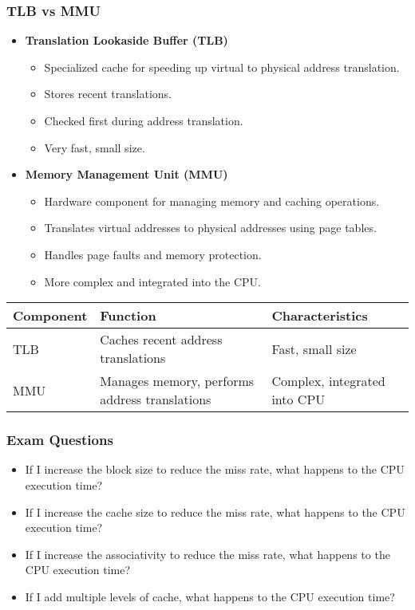 \begin{frame}
    \frametitle{TLB vs MMU}

    \begin{itemize}
        \item \textbf{Translation Lookaside Buffer (TLB)}
        \begin{itemize}
            \item Specialized cache for speeding up virtual to physical address translation.
            \item Stores recent translations.
            \item Checked first during address translation.
            \item Very fast, small size.
        \end{itemize}
        \item \textbf{Memory Management Unit (MMU)}
        \begin{itemize}
            \item Hardware component for managing memory and caching operations.
            \item Translates virtual addresses to physical addresses using page tables.
            \item Handles page faults and memory protection.
            \item More complex and integrated into the CPU.
        \end{itemize}
    \end{itemize}
    
    \begin{table}[h!]
        \centering
        \begin{tabular}{|p{2cm}|p{3cm}|p{3cm}|}
            \hline
            \textbf{Component} & \textbf{Function} & \textbf{Characteristics} \\
            \hline
    TLB & Caches recent address translations & Fast, small size \\
            \hline
    MMU & Manages memory, performs address translations & Complex, integrated into CPU \\
            \hline
        \end{tabular}
    \end{table}

\end{frame}

\begin{frame}
    \frametitle{Exam Questions}
    \begin{itemize}
        \item If I increase the block size to reduce the miss rate, what happens to the CPU execution time?
        \item If I increase the cache size to reduce the miss rate, what happens to the CPU execution time?
        \item If I increase the associativity to reduce the miss rate, what happens to the CPU execution time?
        \item If I add multiple levels of cache, what happens to the CPU execution time?
    \end{itemize}
\end{frame}

